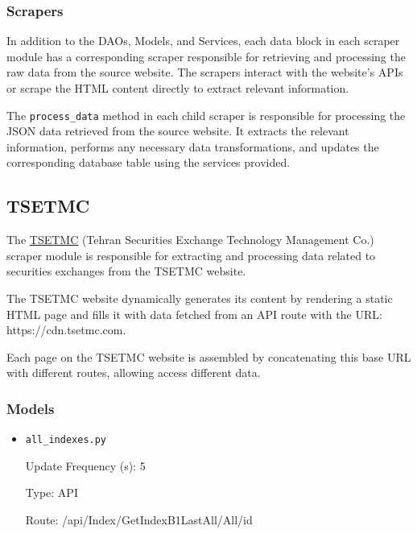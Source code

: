{	\subsubsection{Scrapers}

	In addition to the DAOs, Models, and Services, each data block in each scraper module has a corresponding scraper responsible for retrieving and processing the raw data from the source website. The scrapers interact with the website's APIs or scrape the HTML content directly to extract relevant information.

	The \texttt{process\_data} method in each child scraper is responsible for processing the JSON data retrieved from the source website. It extracts the relevant information, performs any necessary data transformations, and updates the corresponding database table using the services provided.

	\newpage
	\subsection{TSETMC}

	The \hyperlink{https://www.tsetmc.com/}{TSETMC} (Tehran Securities Exchange Technology Management Co.) scraper module is responsible for extracting and processing data related to securities exchanges from the TSETMC website.

	The TSETMC website dynamically generates its content by rendering a static HTML page and fills it with data fetched from an API route with the URL: https://cdn.tsetmc.com.

	Each page on the TSETMC website is assembled by concatenating this base URL with different routes, allowing access different data.

	\subsubsection{Models}

	\begin{itemize}

      	\item \texttt{all\_indexes.py}

      	Update Frequency (s): 5

      	Type: API

      	Route: /api/Index/GetIndexB1LastAll/All/id


\end{itemize}}
